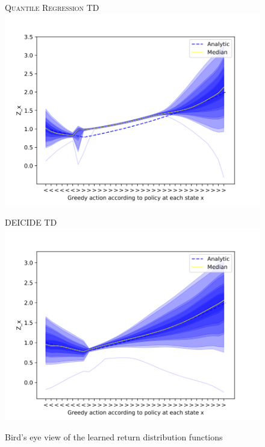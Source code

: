 \begin{figure}[h]
  \newcommand{\munosbirdscale}{0.275}
  \centering
  \begin{minipage}{0.49\linewidth}
    \centering
    \textsc{Quantile Regression TD}\\
    \includegraphics[scale=\munosbirdscale]{results/dt51-munos-overview}
  \end{minipage}%
  \begin{minipage}{0.49\linewidth}
    \centering
    \textsc{DEICIDE TD}\\
    \includegraphics[scale=\munosbirdscale]{results/ct51-munos-overview}
  \end{minipage}%
  \caption{Bird's eye view of the learned return distribution
    functions}
  \label{fig:exp:munos:bird}
\end{figure}

